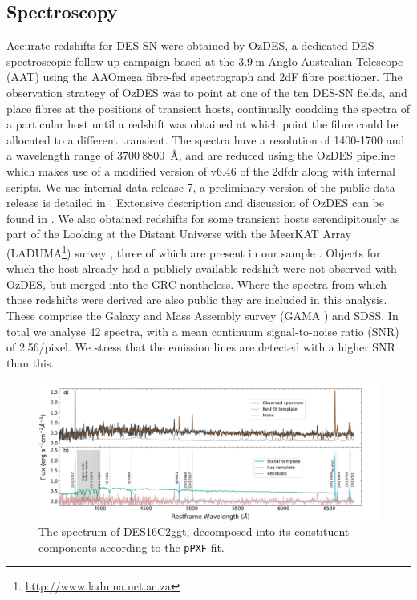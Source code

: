 \documentclass[fleqn,usenatbib,]{mnras}
\newcommand{\replychris}[1]{\color{magenta}#1 \color{black}}
\begin{document}
\subsection{Spectroscopy \label{subsec:spec}}
Accurate redshifts for DES-SN were obtained by OzDES, a dedicated DES spectroscopic follow-up campaign based at the $3.9~\textrm{m}$ Anglo-Australian Telescope (AAT) using the AAOmega fibre-fed spectrograph and 2dF fibre positioner. The observation strategy of OzDES was to point at one of the ten DES-SN fields, and place fibres at the positions of transient hosts, continually coadding the spectra of a particular host until a redshift was obtained at which point the fibre could be allocated to a different transient. The spectra have a resolution of 1400-1700 and a wavelength range of $3700~8800$~\AA, and are reduced using the OzDES pipeline which makes use of a modified version of v6.46 of the 2dfdr \citep{Croom2004} along with internal scripts. \replychris{We use internal data release 7, a preliminary version of the public data release is detailed in \citet{Lidman2020}.} Extensive description and discussion of OzDES can be found in \citet{Yuan2015,Childress2017,Lidman2020}. \replychris{We also obtained redshifts for some transient hosts serendipitously as part of the Looking at the Distant Universe with the MeerKAT Array (LADUMA\footnote{\url{http://www.laduma.uct.ac.za}}) survey  \citep{Baker2020}, three of which are present in our sample} .
Objects for which the host already had a publicly available redshift were not observed with OzDES, but merged into the GRC nontheless.  Where the spectra from which those redshifts were derived are also public they are included in this analysis. These comprise the Galaxy and Mass Assembly survey (GAMA \citealt{Driver2009,Baldry2018}) and SDSS. In total we analyse 42 spectra, with a mean continuum signal-to-noise ratio (SNR) of 2.56/pixel. We stress that the emission lines are detected with a higher SNR than this.

\begin{figure}
\includegraphics[width=\textwidth]{figs/gal_spec.png}
\caption{The spectrum of DES16C2ggt, decomposed into its constituent components according to the \texttt{pPXF} fit. 
\label{fig:host_spec}}
\end{figure}
\end{document}
